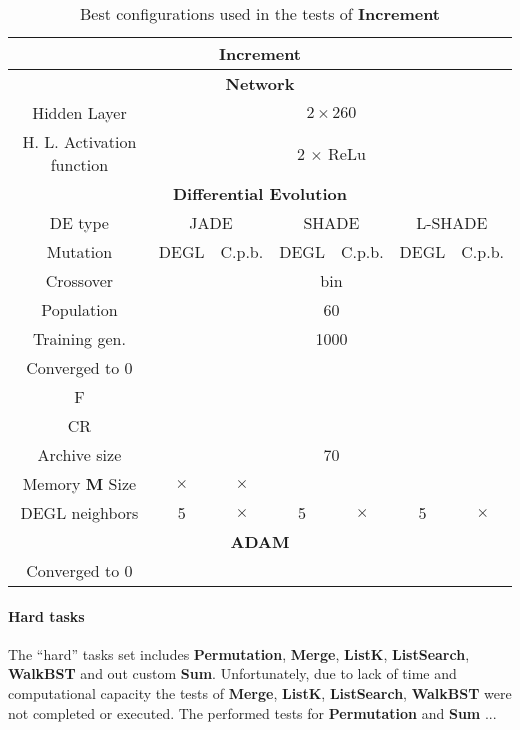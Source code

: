 \begin{table}[!h]
	\centering
	\begin{tabular}{|c|c|c|c|c|c|c|}
		\hline
		\multicolumn{7}{|c|}{\textbf{Increment}} \\ \hline \hline
		\multicolumn{7}{|c|}{\textbf{Network}} \\ \hline
		Hidden Layer & \multicolumn{6}{c|}{$2 \times 260$}\\ \hline
		H. L. Activation function & \multicolumn{6}{c|}{2 $\times$ ReLu}\\ \hline \hline
		\multicolumn{7}{|c|}{\textbf{Differential Evolution}} \\ \hline
		DE type & \multicolumn{2}{c|}{JADE} & \multicolumn{2}{c|}{SHADE} & \multicolumn{2}{c|}{L-SHADE}  \\ \hline
		Mutation & DEGL & C.p.b. & DEGL & C.p.b. & DEGL & C.p.b. \\ \hline
		Crossover & \multicolumn{6}{c|}{bin} \\ \hline
		Population & \multicolumn{6}{c|}{60} \\ \hline
		Training gen. & \multicolumn{6}{c|}{1000} \\ \hline
		Converged to 0 & & & & & & \\ \hline
		F & & & & & &\\ \hline
		CR & & & & & &\\ \hline
		Archive size & \multicolumn{6}{c|}{70} \\ \hline
		Memory \textbf{M} Size & $\times$ & $\times$ & & & &\\ \hline
		DEGL neighbors & 5 & $\times$ & 5 & $\times$ & 5 & $\times$  \\ \hline\hline
		\multicolumn{7}{|c|}{\textbf{ADAM}} \\ \hline
		Converged to 0 & \multicolumn{6}{|c|}{\checkmark} \\ \hline
 	\end{tabular}
	\caption{Best configurations used in the tests of \textbf{Increment}}
	\label{tbl:tests-configurations-increment}
\end{table}

\paragraph{Hard tasks} 
The ``hard'' tasks set includes \textbf{Permutation}, \textbf{Merge}, \textbf{ListK}, \textbf{ListSearch}, \textbf{WalkBST} and out custom \textbf{Sum}. Unfortunately, due to lack of time and computational capacity the tests of \textbf{Merge}, \textbf{ListK}, \textbf{ListSearch}, \textbf{WalkBST} were not completed or executed. The performed tests for \textbf{Permutation} and \textbf{Sum} ... %

